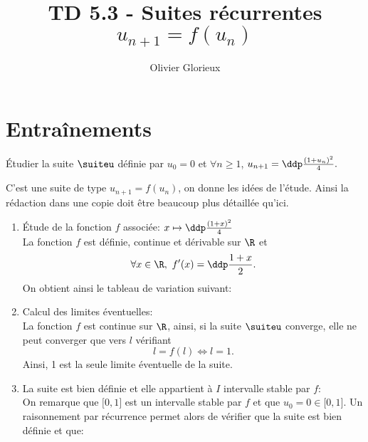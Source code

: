 \documentclass[a4paper, 11pt]{article}
\author{Olivier Glorieux}
\newcommand{\type}{TD }
\begin{document}
\title{\type  5.3 - Suites récurrentes $u_{n+1}=f(u_n)$}


\section*{Entraînements}
\begin{exercice} \;
\'Etudier la suite $\suiteu$ d\'efinie par $u_0=0$ et $\forall n \geq 1$, $u_{n+1}=\ddp\frac{(1+u_n)^2}{4}.$
\end{exercice}

\begin{correction} \;
C'est une suite de type $u_{n+1}=f(u_n)$, on donne les id\'ees de l'\'etude. Ainsi la r\'edaction dans une copie doit \^{e}tre beaucoup plus d\'etaill\'ee qu'ici.
\begin{enumerate}
 \item \'Etude de la fonction $f$ associ\'ee: $x\mapsto \ddp\frac{(1+x)^2}{4}$\\
\noindent La fonction $f$ est d\'efinie, continue et d\'erivable sur $\R$ et 
$$\forall x\in\R,\ f^{\prime}(x)=\ddp\frac{1+x}{2}.$$
On obtient ainsi le tableau de variation suivant:
\begin{center}
\end{center}
\item Calcul des limites \'eventuelles:\\
\noindent La fonction $f$ est continue sur $\R$, ainsi, si la suite $\suiteu$ converge, elle ne peut converger que vers $l$ v\'erifiant 
$$l=f(l)\Leftrightarrow l=1.$$
Ainsi, 1 est la seule limite \'eventuelle de la suite.
\item La suite est bien d\'efinie et elle appartient \`{a} $I$ intervalle stable par $f$:\\
\noindent On remarque que $\lbrack 0,1\rbrack$ est un intervalle stable par $f$ et que $u_0=0\in\lbrack 0,1\rbrack$. Un raisonnement par r\'ecurrence permet alors de v\'erifier que la suite est bien d\'efinie et que:

\end{enumerate}
\end{correction}
\end{document}
